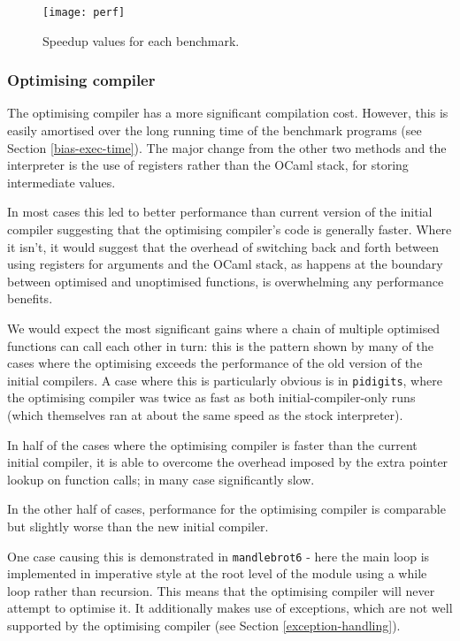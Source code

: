 \begin{landscape}
      \begin{figure}[h]
            \texttt{[image: perf]}
            \caption{Speedup values for each benchmark.}
            \label{fig:perf}
      \end{figure}
\end{landscape}

\subsubsection{Optimising compiler}

The optimising compiler has a more significant compilation cost. However, this is easily amortised
over the long running time of the benchmark programs (see Section \ref{bias-exec-time}). The major
change
from the other two methods and the interpreter is the use of registers rather than the OCaml stack,
for storing intermediate values.

In most cases this led to better performance than current version of the initial compiler
suggesting
that the optimising compiler's code is generally faster. Where it isn't, it would suggest that the
overhead of switching back and forth between using registers for arguments and the OCaml stack, as
happens at the boundary between optimised and unoptimised functions, is overwhelming any
performance
benefits.

We would expect the most significant gains where a chain of multiple optimised functions can call
each other in turn: this is the pattern shown by many of the cases where the optimising exceeds the
performance of the old version of the initial compilers. A case where this is particularly obvious
is in \texttt{pidigits}, where the optimising compiler was twice as fast as both
initial-compiler-only runs (which themselves ran at about the same speed as the stock interpreter).

In half of the cases where the optimising compiler is faster than the current initial
compiler, it is able to overcome the overhead imposed by the extra pointer lookup on function
calls; in many
case significantly slow.

In the other half of cases, performance for the optimising compiler is comparable but slightly
worse
than the new initial compiler.

One case causing this is demonstrated in \texttt{mandlebrot6} - here the main loop is implemented
in
imperative style at the root level of the module using a while loop rather than recursion. This
means that the optimising compiler will never attempt to optimise it. It additionally makes use of
exceptions, which are not well supported by the optimising compiler (see Section
\ref{exception-handling}).

